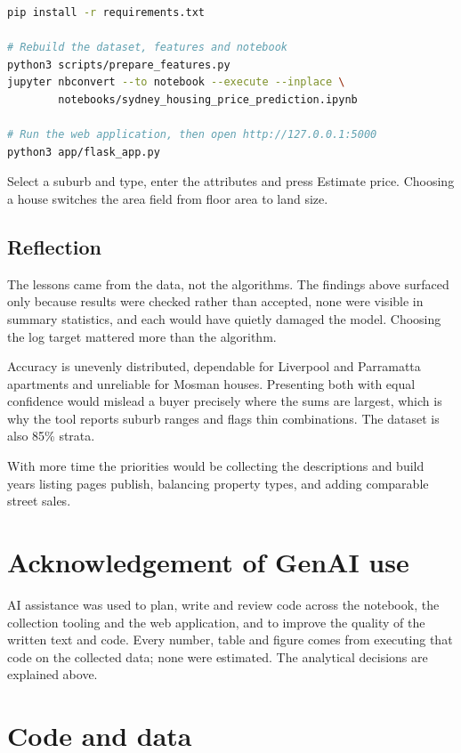 \documentclass[11pt,a4paper]{article}
\begin{document}
\begin{lstlisting}[language=bash]
pip install -r requirements.txt

# Rebuild the dataset, features and notebook
python3 scripts/prepare_features.py
jupyter nbconvert --to notebook --execute --inplace \
        notebooks/sydney_housing_price_prediction.ipynb

# Run the web application, then open http://127.0.0.1:5000
python3 app/flask_app.py
\end{lstlisting}

Select a suburb and type, enter the attributes and press Estimate price.
Choosing a house switches the area field from floor area to land size.

\subsection{Reflection}

The lessons came from the data, not the algorithms. The findings above
surfaced only because results were checked rather than accepted, none
were visible in summary statistics, and each would have quietly damaged
the model. Choosing the log target mattered more than the algorithm.

Accuracy is unevenly distributed, dependable for Liverpool and
Parramatta apartments and unreliable for Mosman houses. Presenting both
with equal confidence would mislead a buyer precisely where the sums are
largest, which is why the tool reports suburb ranges and flags thin
combinations. The dataset is also 85\% strata.

With more time the priorities would be collecting the descriptions and
build years listing pages publish, balancing property types, and adding
comparable street sales.

\section*{Acknowledgement of GenAI use}

AI assistance was used to plan, write and review code across the
notebook, the collection tooling and the web application, and to improve
the quality of the written text and code. Every number, table and figure
comes from executing that code on the collected data; none were
estimated. The analytical decisions are explained above.

\section*{Code and data}
\end{document}
